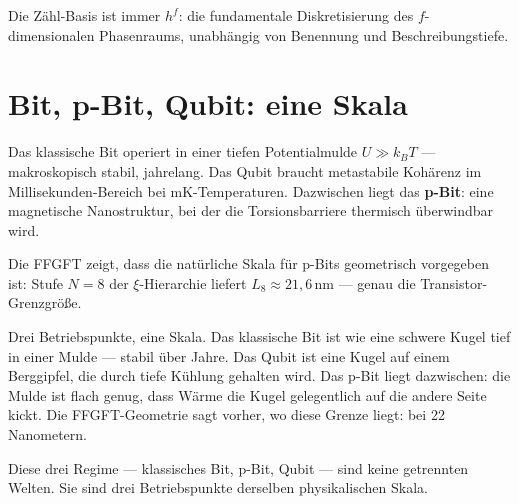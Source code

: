 Die Zähl-Basis ist immer $h^f$: die fundamentale Diskretisierung des
$f$-dimensionalen Phasenraums, unabhängig von Benennung und Beschreibungstiefe.

\section{Bit, p-Bit, Qubit: eine Skala}

Das klassische Bit operiert in einer tiefen Potentialmulde $U \gg k_B T$ ---
makroskopisch stabil, jahrelang. Das Qubit braucht metastabile Kohärenz
im Millisekunden-Bereich bei mK-Temperaturen. Dazwischen liegt das
\textbf{p-Bit}: eine magnetische Nanostruktur, bei der die Torsionsbarriere
thermisch überwindbar wird.

Die FFGFT zeigt, dass die natürliche Skala für p-Bits geometrisch
vorgegeben ist: Stufe $N = 8$ der $\xi$-Hierarchie liefert
$L_8 \approx 21{,}6\,\text{nm}$ --- genau die Transistor-Grenzgröße. 

\begin{laierspur}
Drei Betriebspunkte, eine Skala. Das klassische Bit ist wie eine schwere
Kugel tief in einer Mulde --- stabil über Jahre. Das Qubit ist eine Kugel
auf einem Berggipfel, die durch tiefe Kühlung gehalten wird.
Das p-Bit liegt dazwischen: die Mulde ist flach genug, dass Wärme die Kugel
gelegentlich auf die andere Seite kickt. Die FFGFT-Geometrie sagt vorher,
wo diese Grenze liegt: bei 22 Nanometern.
\end{laierspur}

Diese drei Regime --- klassisches Bit, p-Bit, Qubit --- sind keine
getrennten Welten. Sie sind drei Betriebspunkte derselben physikalischen
Skala. 
